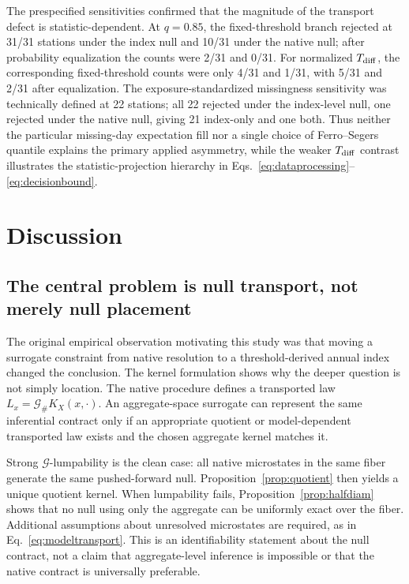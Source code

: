 The prespecified sensitivities confirmed that the magnitude of the transport defect is statistic-dependent. At $q=0.85$, the fixed-threshold branch rejected at 31/31 stations under the index null and 10/31 under the native null; after probability equalization the counts were 2/31 and 0/31. For normalized $T_{\rm diff}$, the corresponding fixed-threshold counts were only 4/31 and 1/31, with 5/31 and 2/31 after equalization. The exposure-standardized missingness sensitivity was technically defined at 22 stations; all 22 rejected under the index-level null, one rejected under the native null, giving 21 index-only and one both. Thus neither the particular missing-day expectation fill nor a single choice of Ferro--Segers quantile explains the primary applied asymmetry, while the weaker $T_{\rm diff}$ contrast illustrates the statistic-projection hierarchy in Eqs.~\eqref{eq:dataprocessing}--\eqref{eq:decisionbound}.

\section{Discussion}\label{sec:discussion}

\subsection{The central problem is null transport, not merely null placement}\label{sec:discussiontransport}

The original empirical observation motivating this study was that moving a surrogate constraint from native resolution to a threshold-derived annual index changed the conclusion. The kernel formulation shows why the deeper question is not simply location. The native procedure defines a transported law $L_x=\mathcal G_\#K_X(x,\cdot)$. An aggregate-space surrogate can represent the same inferential contract only if an appropriate quotient or model-dependent transported law exists and the chosen aggregate kernel matches it.

Strong $\mathcal G$-lumpability is the clean case: all native microstates in the same fiber generate the same pushed-forward null. Proposition~\ref{prop:quotient} then yields a unique quotient kernel. When lumpability fails, Proposition~\ref{prop:halfdiam} shows that no null using only the aggregate can be uniformly exact over the fiber. Additional assumptions about unresolved microstates are required, as in Eq.~\eqref{eq:modeltransport}. This is an identifiability statement about the null contract, not a claim that aggregate-level inference is impossible or that the native contract is universally preferable.

